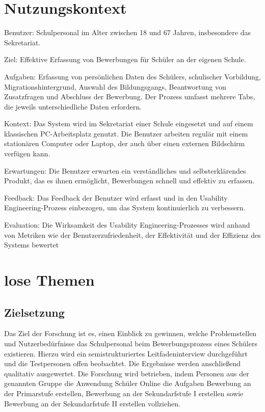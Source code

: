 
\section{Nutzungskontext}
Benutzer: Schulpersonal im Alter zwischen 18 und 67 Jahren, insbesondere das Sekretariat.

Ziel: Effektive Erfassung von Bewerbungen für Schüler an der eigenen Schule.

Aufgaben: Erfassung von persönlichen Daten des Schülers, schulischer Vorbildung, Migrationshintergrund, Auswahl des Bildungsgangs, Beantwortung von Zusatzfragen und Abschluss der Bewerbung. Der Prozess umfasst mehrere Tabs, die jeweils unterschiedliche Daten erfordern.

Kontext: Das System wird im Sekretariat einer Schule eingesetzt und auf einem klassischen PC-Arbeitsplatz genutzt. Die Benutzer arbeiten regulär mit einem stationären Computer oder Laptop, der auch über einen externen Bildschirm verfügen kann.

Erwartungen: Die Benutzer erwarten ein verständliches und selbsterklärendes Produkt, das es ihnen ermöglicht, Bewerbungen schnell und effektiv zu erfassen.

Feedback: Das Feedback der Benutzer wird erfasst und in den Usability Engineering-Prozess einbezogen, um das System kontinuierlich zu verbessern.

Evaluation: Die Wirksamkeit des Usability Engineering-Prozesses wird anhand von Metriken wie der Benutzerzufriedenheit, der Effektivität und der Effizienz des Systems bewertet

\section{lose Themen}
\subsection{Zielsetzung}
Das Ziel der Forschung ist es, einen Einblick zu gewinnen, welche Problemstellen und Nutzerbedürfnisse das Schulpersonal beim Bewerbungsprozess eines Schülers existieren. Hierzu wird ein semistrukturiertes Leitfadeninterview durchgeführt und die Testpersonen offen beobachtet. Die Ergebnisse werden anschließend qualitativ ausgewertet. Die Forschung wird betrieben, indem Personen aus der genannten Gruppe die Anwendung Schüler Online die Aufgaben \glqq Bewerbung an der Primarstufe erstellen\grqq{}, \glqq Bewerbung an der Sekundarfstufe I erstellen\grqq{} sowie \glqq Bewerbung an der Sekundarfstufe II erstellen\grqq{} vollziehen. 

